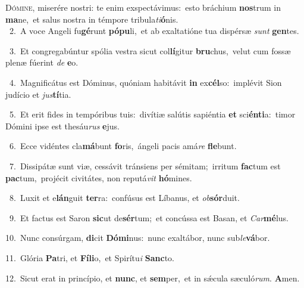 \lettrine{\initial\textcolor{\initialcolor}{D}}{ómine,} miserére nostri: te enim exspectávimus:~\dagger esto bráchium \textbf{nos}\-trum in \textbf{ma}\-ne,~\star et salus nostra in témpore tribula\-\textit{ti}\-\textbf{ó}nis.\\
{\numbfont\textcolor{\numbcolor}{~2.}}~A voce Angeli fu\-\textbf{gé}\-runt \textbf{pó}\-\textbf{pu}li,~\star et ab exaltatióne tua dispérsæ \textit{sunt} \textbf{gen}\-tes.\par
{\numbfont\textcolor{\numbcolor}{~3.}}~Et congregabúntur spólia vestra sicut col\-\textbf{lí}\-gitur \textbf{bru}\-chus,~\star velut cum fossæ plenæ fúerint \textit{de} \textbf{e}\-o.\par
{\numbfont\textcolor{\numbcolor}{~4.}}~Magnificátus est Dóminus, quóniam habitávit \textbf{in} ex\-\textbf{cél}\-so:~\star implévit Sion judício et \textit{jus}\-\textbf{tí}tia.\par
{\numbfont\textcolor{\numbcolor}{~5.}}~Et erit fides in tempóribus tuis:~\dagger divítiæ salútis sapiéntia \textbf{et} sci\-\textbf{én}\-\textbf{ti}a:~\star timor Dómini ipse est thesáu\textit{rus} \textbf{e}\-jus.\par
{\numbfont\textcolor{\numbcolor}{~6.}}~Ecce vidéntes cla\-\textbf{má}\-bunt \textbf{fo}\-ris,~\star ángeli pacis amá\textit{re} \textbf{fle}\-bunt.\par
{\numbfont\textcolor{\numbcolor}{~7.}}~Dissipátæ sunt viæ, cessávit tránsiens per sémitam;~\dagger irritum \textbf{fac}\-tum est \textbf{pac}\-tum,~\star projécit civitátes, non reputá\textit{vit} \textbf{hó}\-mines.\par
{\numbfont\textcolor{\numbcolor}{~8.}}~Luxit et e\-\textbf{lán}\-guit \textbf{ter}\-ra:~\star confúsus est Líbanus, et \textit{ob}\-\textbf{sór}duit.\par
{\numbfont\textcolor{\numbcolor}{~9.}}~Et factus est Saron \textbf{sic}\-ut de\-\textbf{sér}\-tum;~\star et concússa est Basan, et \textit{Car}\-\textbf{mé}lus.\par
{\numbfont\textcolor{\numbcolor}{10.}}~Nunc consúrgam, \textbf{di}\-cit \textbf{Dó}\-\textbf{mi}nus:~\star nunc exaltábor, nunc sub\-\textit{le}\-\textbf{vá}bor.\par
{\numbfont\textcolor{\numbcolor}{11.}}~Glória \textbf{Pa}\-tri, et \textbf{Fí}\-\textbf{li}o,~\star et Spirítu\textit{i} \textbf{Sanc}\-to.\par
{\numbfont\textcolor{\numbcolor}{12.}}~Sicut erat in princípio, et \textbf{nunc}\-, et \textbf{sem}\-per,~\star et in sǽcula sæculó\-\textit{rum}\-. \textbf{A}\-men.\par
